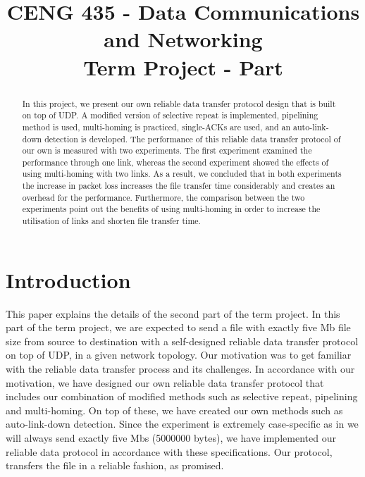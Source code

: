 \documentclass[conference]{IEEEtran}
\begin{document}
\newcommand{\RN}[1]{%
  \textup{\uppercase\expandafter{\romannumeral#1}}%
}

\title{CENG 435 - Data Communications and Networking\\
Term Project - Part \RN{2}}

\author{
\and
{}
}

\maketitle

\begin{abstract}
    In this project, we present our own reliable data transfer protocol design that is built on top of UDP. A modified version of selective repeat is implemented, pipelining method is used, multi-homing is practiced, single-ACKs are used, and an auto-link-down detection is developed. The performance of this reliable data transfer protocol of our own is measured with two experiments. The first experiment examined the performance through one link, whereas the second experiment showed the effects of using multi-homing with two links. As a result, we concluded that in both experiments the increase in packet loss increases the file transfer time considerably and creates an overhead for the performance. Furthermore, the comparison between the two experiments point out the benefits of using multi-homing in order to increase the utilisation of links and shorten file transfer time.

\end{abstract}

\section{Introduction}


    This paper explains the details of the second part of the term project. In this part of the term project, we are expected to send a file with exactly five Mb file size from source to destination with a self-designed reliable data transfer protocol on top of UDP, in a given network topology. Our motivation was to get familiar with the reliable data transfer process and its challenges. In accordance with our motivation, we have designed our own reliable data transfer protocol that includes our combination of modified methods such as selective repeat, pipelining and multi-homing. On top of these, we have created our own methods such as auto-link-down detection. Since the experiment is extremely case-specific as in we will always send exactly five Mbs (5000000 bytes), we have implemented our reliable data protocol in accordance with these specifications. Our protocol, transfers the file in a reliable fashion, as promised.
    
\end{document}
